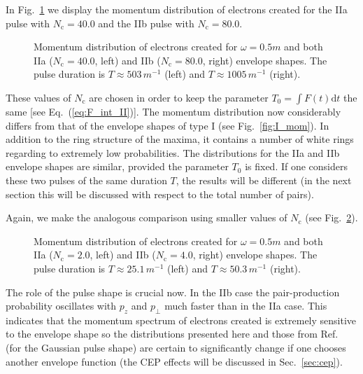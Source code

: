 \documentclass[preprint,aps,prd,showpacs,floatfix]{revtex4-1}
\begin{document}
\indent In Fig.~\ref{fig:II_mom} we display the momentum distribution of electrons created for the IIa pulse with $N_\text{c} = 40.0$ and the IIb pulse with $N_\text{c} = 80.0$.
%
\begin{figure}[h]
\caption{Momentum distribution of electrons created for $\omega = 0.5m$ and both IIa ($N_\text{c} = 40.0$, left) and IIb ($N_\text{c} = 80.0$, right) envelope shapes. The pulse duration is $T\approx 503 \, m^{-1}$ (left) and $T\approx 1005 \, m^{-1}$ (right).}
\label{fig:II_mom}
\end{figure}
%
These values of $N_\text{c}$ are chosen in order to keep the parameter $T_0 = \int F(t) \mathrm{d} t$ the same [see Eq.~(\ref{eq:F_int_II})]. The momentum distribution now considerably differs from that of the envelope shapes of type I (see Fig.~\ref{fig:I_mom}). In addition to the ring structure of the maxima, it contains a number of white rings regarding to extremely low probabilities. The distributions for the IIa and IIb envelope shapes are similar, provided the parameter $T_0$ is fixed. If one considers these two pulses of the same duration $T$, the results will be different (in the next section this will be discussed with respect to the total number of pairs).

\indent Again, we make the analogous comparison using smaller values of $N_\text{c}$ (see Fig.~\ref{fig:II_mom_short}).
%
\begin{figure}[h]
\caption{Momentum distribution of electrons created for $\omega = 0.5m$ and both IIa ($N_\text{c} = 2.0$, left) and IIb ($N_\text{c} = 4.0$, right) envelope shapes. The pulse duration is $T\approx 25.1 \, m^{-1}$ (left) and $T\approx 50.3 \, m^{-1}$ (right).}
\label{fig:II_mom_short}
\end{figure}
The role of the pulse shape is crucial now. In the IIb case the pair-production probability oscillates with $p_z$ and $p_\perp$ much faster than in the IIa case. This indicates that the momentum spectrum of electrons created is extremely sensitive to the envelope shape so the distributions presented here and those from Ref.~\cite{hebenstreit_prl_2009} (for the Gaussian pulse shape) are certain to significantly change if one chooses another envelope function (the CEP effects will be discussed in Sec.~\ref{sec:cep}).
\end{document}
